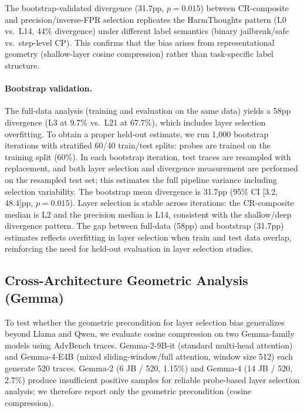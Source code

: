 The bootstrap-validated divergence (31.7pp, $p{=}0.015$) between CR-composite and precision/inverse-FPR selection replicates the HarmThoughts pattern (L0 vs.\ L14, 44\% divergence) under different label semantics (binary jailbreak/safe vs.\ step-level CP). This confirms that the bias arises from representational geometry (shallow-layer cosine compression) rather than task-specific label structure.

\paragraph{Bootstrap validation.} The full-data analysis (training and evaluation on the same data) yields a 58pp divergence (L3 at 9.7\% vs.\ L21 at 67.7\%), which includes layer selection overfitting. To obtain a proper held-out estimate, we run 1{,}000 bootstrap iterations with stratified 60/40 train/test splits: probes are trained on the training split (60\%). In each bootstrap iteration, test traces are resampled with replacement, and both layer selection and divergence measurement are performed on the resampled test set; this estimates the full pipeline variance including selection variability. The bootstrap mean divergence is 31.7pp (95\% CI [3.2, 48.4]pp, $p{=}0.015$). Layer selection is stable across iterations: the CR-composite median is L2 and the precision median is L14, consistent with the shallow/deep divergence pattern. The gap between full-data (58pp) and bootstrap (31.7pp) estimates reflects overfitting in layer selection when train and test data overlap, reinforcing the need for held-out evaluation in layer selection studies.

\subsection{Cross-Architecture Geometric Analysis (Gemma)}
\label{app:gemma_cross_arch}

To test whether the geometric precondition for layer selection bias generalizes beyond Llama and Qwen, we evaluate cosine compression on two Gemma-family models using AdvBench traces. Gemma-2-9B-it (standard multi-head attention) and Gemma-4-E4B (mixed sliding-window/full attention, window size 512) each generate 520 traces. Gemma-2 (6 JB / 520, 1.15\%) and Gemma-4 (14 JB / 520, 2.7\%) produce insufficient positive samples for reliable probe-based layer selection analysis; we therefore report only the geometric precondition (cosine compression).

